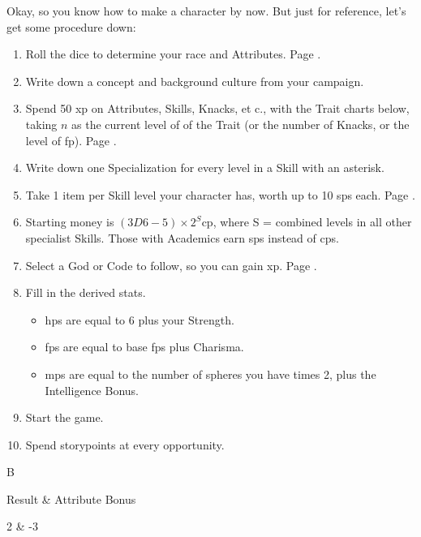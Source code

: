 \begin{multicols}{2}

\noindent
Okay, so you know how to make a character by now.  But just for reference, let's get some procedure down:

\begin{enumerate}
	\item
	Roll the dice to determine your race and Attributes.  Page \pageref{character_rolls}.
	\item
	Write down a concept and background culture from your campaign.
	\item
	Spend 50 \gls{xp} on Attributes, Skills, Knacks, et c., with the Trait charts below, taking $n$ as the current level of of the Trait (or the number of Knacks, or the level of \gls{fp}).
	Page \pageref{xp}.
	\item
	Write down one Specialization for every level in a Skill with an asterisk.
	\item
	Take 1 item per Skill level your character has, worth up to 10 \glspl{sp} each.  Page \pageref{start_equipment}.
	\item
	Starting money is $(3D6-5)\times 2^S$\gls{cp}, where S = combined levels in all other specialist Skills. Those with Academics earn \glspl{sp} instead of \glspl{cp}.
	\item
	Select a God or Code to follow, so you can gain \gls{xp}.  Page \pageref{gods_codes}.
	\item
	Fill in the derived stats.
	\begin{itemize}

		\item
		\glspl{hp} are equal to 6 plus your Strength.
		\item
		\glspl{fp} are equal to base \glspl{fp} plus Charisma.
		\item
		\glspl{mp} are equal to the number of spheres you have times 2, plus the Intelligence Bonus.

	\end{itemize}
	\item
	Start the game.
	\item
	Spend \glspl{storypoint} at every opportunity.
\end{enumerate}

\columnbreak

\begin{xpbox}{B}

	Result & Attribute Bonus \\\hline

	2 & -3 \\


\end{xpbox}
\end{multicols}
